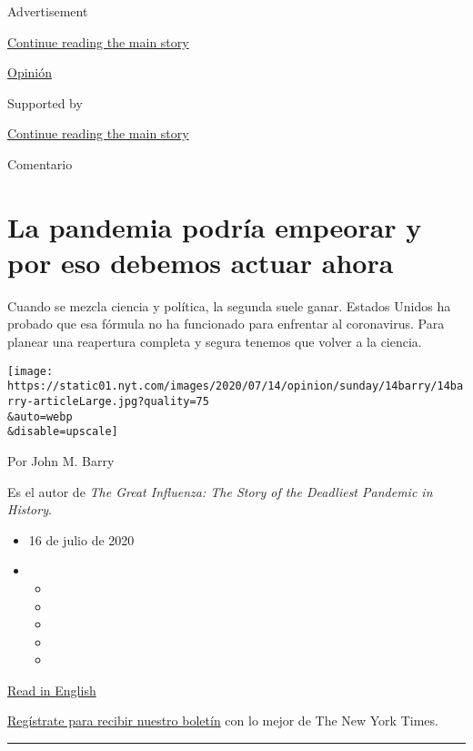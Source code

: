 Advertisement

\protect\hyperlink{after-top}{Continue reading the main story}

\href{/es/section/opinion}{Opinión}

Supported by

\protect\hyperlink{after-sponsor}{Continue reading the main story}

Comentario

\hypertarget{la-pandemia-podruxeda-empeorar-y-por-eso-debemos-actuar-ahora}{%
\section{La pandemia podría empeorar y por eso debemos actuar
ahora}\label{la-pandemia-podruxeda-empeorar-y-por-eso-debemos-actuar-ahora}}

Cuando se mezcla ciencia y política, la segunda suele ganar. Estados
Unidos ha probado que esa fórmula no ha funcionado para enfrentar al
coronavirus. Para planear una reapertura completa y segura tenemos que
volver a la ciencia.

\texttt{[image: https://static01.nyt.com/images/2020/07/14/opinion/sunday/14barry/14barry-articleLarge.jpg?quality=75\\\&auto=webp\\\&disable=upscale]}

Por John M. Barry

Es el autor de \emph{The Great Influenza: The Story of the Deadliest
Pandemic in History}.

\begin{itemize}
\item
  16 de julio de 2020
\item
  \begin{itemize}
  \item
  \item
  \item
  \item
  \item
  \end{itemize}
\end{itemize}

\href{https://www.nytimes.com/2020/07/14/opinion/coronavirus-shutdown.html}{Read
in English}

\href{https://www.nytimes.com/newsletters/el-times}{Regístrate para
recibir nuestro boletín} con lo mejor de The New York Times.

\begin{center}\rule{0.5\linewidth}{\linethickness}\end{center}

